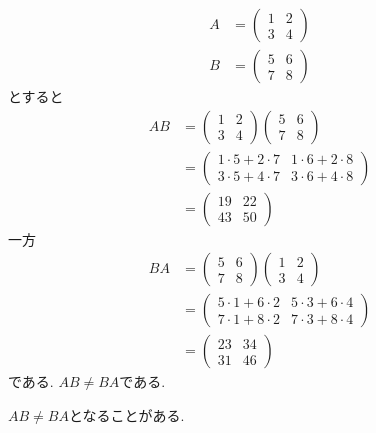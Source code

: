 \begin{example}
  \begin{align*}
    A&=\begin{pmatrix}1&2\\3&4\end{pmatrix}\\
    B&=\begin{pmatrix}5&6\\7&8\end{pmatrix}
  \end{align*}
  とすると
  \begin{align*}
    AB&=\begin{pmatrix}1&2\\3&4\end{pmatrix}\begin{pmatrix}5&6\\7&8\end{pmatrix}\\
      &=\begin{pmatrix}1\cdot 5+2\cdot 7&1\cdot 6+2\cdot 8\\
      3\cdot 5+4\cdot 7&3\cdot 6+4\cdot 8\end{pmatrix}\\
      &=\begin{pmatrix}19&22\\43&50\end{pmatrix}
  \end{align*}
  一方
  \begin{align*}
    BA&=\begin{pmatrix}5&6\\7&8\end{pmatrix}\begin{pmatrix}1&2\\3&4\end{pmatrix}\\
      &=\begin{pmatrix}
      5\cdot 1+6\cdot 2&5\cdot 3+6\cdot 4\\
      7\cdot 1+8\cdot 2&7\cdot 3+8\cdot 4
      \end{pmatrix}\\
      &=\begin{pmatrix}23&34\\31&46\end{pmatrix}
  \end{align*}
  である. $AB\neq BA$である.
\end{example}
\begin{remark}
   $AB\neq BA$となることがある.
\end{remark}

